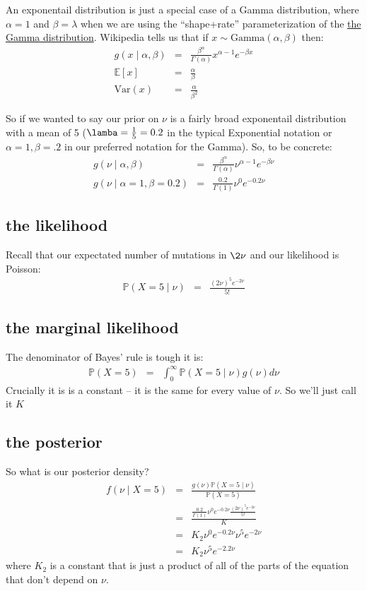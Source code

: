 \documentclass[11pt]{article}
\renewcommand{\Pr}{\mathbb{P}}
\newcommand{\href}[2]{\url{#2}}
\begin{document}
An exponentail distribution is just a special case of a Gamma distribution,
where $\alpha=1$ and $\beta=\lambda$ when we are using the ``shape+rate'' parameterization of the \href{https://en.wikipedia.org/wiki/Gamma_distribution}{the Gamma distribution}.
Wikipedia tells us that if $x\sim \mbox{Gamma}(\alpha, \beta)$ then:
\begin{eqnarray}
g(x \mid \alpha, \beta) &=& \frac{\beta^{\alpha}}{\Gamma(\alpha)}x^{\alpha - 1}e^{-\beta x} \\
\mathbb{E}[x] & = & \frac{\alpha}{\beta} \\
\mbox{Var}(x) & = & \frac{\alpha}{\beta^2}
\end{eqnarray}


So if we wanted to say our prior on $\nu$ is a fairly broad exponentail
    distribution with a mean of 5 ($\lamba=\frac{1}{5}=0.2$ in the typical Exponential
    notation or $\alpha=1,\beta=.2$ in our preferred notation for the Gamma).
So, to be concrete:
\begin{eqnarray}
g(\nu \mid \alpha, \beta) &=& \frac{\beta^{\alpha}}{\Gamma(\alpha)}\nu^{\alpha - 1}e^{-\beta\nu} \\
g(\nu \mid \alpha=1, \beta=0.2) &=& \frac{0.2}{\Gamma(1)}\nu^{0}e^{-0.2\nu} 
\end{eqnarray}

\subsection{the likelihood}
Recall that our expectated number of mutations in $\2\nu$ and our likelihood is Poisson:
\begin{eqnarray}
\Pr(X=5\mid \nu) &= & \frac{(2\nu)^5e^{-2\nu}}{5!}
\end{eqnarray}

\subsection{the marginal likelihood}
The denominator of Bayes' rule is tough it is:
\begin{eqnarray}
\Pr(X=5) &= &\int_0^{\infty} \Pr(X=5\mid \nu)g(\nu) d\nu
\end{eqnarray}
Crucially it is is a constant -- it is the same for every value of $\nu$.
So we'll just call it $K$

\subsection{the posterior}
So what is our posterior density?
\begin{eqnarray}
f(\nu\mid X=5) & = & \frac{g(\nu)\Pr(X=5\mid \nu)}{\Pr(X=5)} \\
& = & \frac{\frac{0.2}{\Gamma(1)}\nu^{0}e^{-0.2\nu}\frac{(2\nu)^5e^{-2\nu}}{5!}}{K}\\
& = & K_2 \nu^{0}e^{-0.2\nu}\nu^{5}e^{-2\nu} \\
& = & K_2 \nu^{5}e^{-2.2\nu}
\end{eqnarray}
where $K_2$ is a constant that is just a product of all of the parts of
the equation that don't depend on $\nu$.
\end{document}
